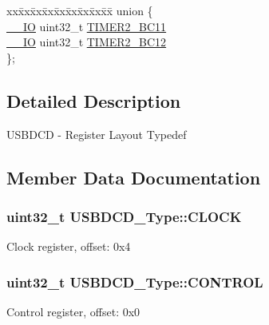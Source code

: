 \begin{DoxyCompactItemize}
\begin{tabbing}
\end{tabbing}\item 
\begin{tabbing}
xx\=xx\=xx\=xx\=xx\=xx\=xx\=xx\=xx\=\kill
union \{\\
\>\hyperlink{core__sc300_8h_aec43007d9998a0a0e01faede4133d6be}{\_\_IO} uint32\_t \hyperlink{structUSBDCD__Type_acf2614fc5d64ffb02c2b6551a4cfcd2a}{TIMER2\_BC11}\\
\>\hyperlink{core__sc300_8h_aec43007d9998a0a0e01faede4133d6be}{\_\_IO} uint32\_t \hyperlink{structUSBDCD__Type_ada6fdec9ca1667fefe2e524287a3665c}{TIMER2\_BC12}\\
\}; \hypertarget{structUSBDCD__Type_a8acf4fe94fc85cd6c852916803797aed}{}\label{structUSBDCD__Type_a8acf4fe94fc85cd6c852916803797aed}
\\

\end{tabbing}\end{DoxyCompactItemize}


\subsection{Detailed Description}
U\+S\+B\+D\+CD -\/ Register Layout Typedef 

\subsection{Member Data Documentation}
\subsubsection[{\texorpdfstring{C\+L\+O\+CK}{CLOCK}}]{ uint32\+\_\+t U\+S\+B\+D\+C\+D\+\_\+\+Type\+::\+C\+L\+O\+CK}\hypertarget{structUSBDCD__Type_a8b412fbc6cfe129f3b73aededa8c2619}{}\label{structUSBDCD__Type_a8b412fbc6cfe129f3b73aededa8c2619}
Clock register, offset\+: 0x4 
\subsubsection[{\texorpdfstring{C\+O\+N\+T\+R\+OL}{CONTROL}}]{ uint32\+\_\+t U\+S\+B\+D\+C\+D\+\_\+\+Type\+::\+C\+O\+N\+T\+R\+OL}\hypertarget{structUSBDCD__Type_a3a2cb0f60abc115c51cf3124ef86e5a0}{}\label{structUSBDCD__Type_a3a2cb0f60abc115c51cf3124ef86e5a0}
Control register, offset\+: 0x0 
